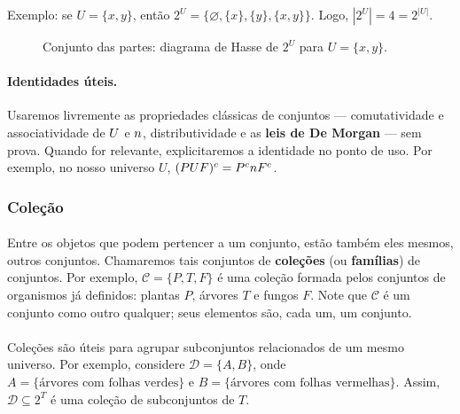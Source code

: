 \documentclass[12pt,a4paper]{article}
\def\cup{\string U}%
\def\cap{\string n}%
\begin{document}
\begin{itemize}
    Exemplo: se \(U = \{x,y\}\), então \(2^U = \{\varnothing, \{x\}, \{y\}, \{x,y\}\}\). Logo, \(|2^U|=4=2^{|U|}\).
    \begin{figure}[H]
    \centering
    \caption{Conjunto das partes: diagrama de Hasse de $2^{U}$ para $U=\{x,y\}$.}
    \label{fig:op-partes}
    \end{figure}
\end{itemize}

\paragraph{Identidades úteis.}
Usaremos livremente as propriedades clássicas de conjuntos — comutatividade e associatividade de \(\cup\) e \(\cap\), distributividade e as \textbf{leis de De Morgan} — sem prova. Quando for relevante, explicitaremos a identidade no ponto de uso. Por exemplo, no nosso universo \(U\), \((P\cup F)^c = P^c\cap F^c\).

\subsubsection{Coleção}

\paragraph{}
Entre os objetos que podem pertencer a um conjunto, estão também eles mesmos, outros conjuntos. Chamaremos tais conjuntos de \textbf{coleções} (ou \textbf{famílias}) de conjuntos. Por exemplo, \(\mathcal{C} = \{P, T, F\}\) é uma coleção formada pelos conjuntos de organismos já definidos: plantas \(P\), árvores \(T\) e fungos \(F\). Note que \(\mathcal{C}\) é um conjunto como outro qualquer; seus elementos são, cada um, um conjunto.

\paragraph{}
Coleções são úteis para agrupar subconjuntos relacionados de um mesmo universo. Por exemplo, considere \(\mathcal{D} = \{A, B\}\), onde \(A = \{\text{árvores com folhas verdes}\}\) e \(B = \{\text{árvores com folhas vermelhas}\}\). Assim, \(\mathcal{D} \subseteq 2^{T}\) é uma coleção de subconjuntos de \(T\).
\end{document}
